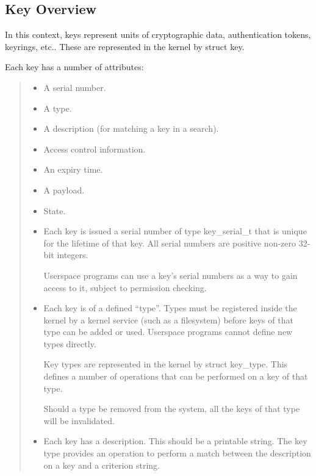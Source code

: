 \documentclass[a4paper,8pt,english]{sphinxmanual}
\begin{document}
\subsection{Key Overview}
\label{security/keys/core:key-overview}
In this context, keys represent units of cryptographic data, authentication
tokens, keyrings, etc.. These are represented in the kernel by struct key.

Each key has a number of attributes:
\begin{quote}
\begin{itemize}
\item {} 
A serial number.

\item {} 
A type.

\item {} 
A description (for matching a key in a search).

\item {} 
Access control information.

\item {} 
An expiry time.

\item {} 
A payload.

\item {} 
State.

\end{itemize}
\begin{itemize}
\item {} 
Each key is issued a serial number of type key\_serial\_t that is unique for
the lifetime of that key. All serial numbers are positive non-zero 32-bit
integers.

Userspace programs can use a key's serial numbers as a way to gain access
to it, subject to permission checking.

\item {} 
Each key is of a defined ``type''. Types must be registered inside the
kernel by a kernel service (such as a filesystem) before keys of that type
can be added or used. Userspace programs cannot define new types directly.

Key types are represented in the kernel by struct key\_type. This defines a
number of operations that can be performed on a key of that type.

Should a type be removed from the system, all the keys of that type will
be invalidated.

\item {} 
Each key has a description. This should be a printable string. The key
type provides an operation to perform a match between the description on a
key and a criterion string.


\end{itemize}
\end{quote}
\end{document}
